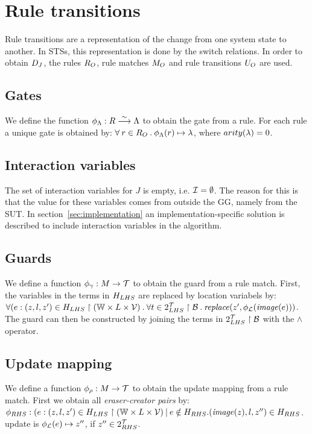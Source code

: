 \section{Rule transitions}
Rule transitions are a representation of the change from one system state to another. In STSs, this representation is done by the switch relations. In order to obtain $D_J$, the rules $R_O$, rule matches $M_O$ and rule transitions $U_O$ are used.

\subsection{Gates}
We define the function $\phi_\Lambda: R \stackrel{\sim}{\longrightarrow} \Lambda$ to obtain the gate from a rule. For each rule a unique gate is obtained by: $\forall\:r \in R_O\: . \: \phi_\Lambda(r) \mapsto \lambda$, where $arity(\lambda) = 0$.

\subsection{Interaction variables}
The set of interaction variables for $J$ is empty, i.e. $\mathcal{I} = \emptyset$. The reason for this is that the value for these variables comes from outside the GG, namely from the SUT. In section~\ref{sec:implementation} an implementation-specific solution is described to include interaction variables in the algorithm. 

\subsection{Guards}
We define a function $\phi_\gamma: M \rightarrow \mathcal{T}$ to obtain the guard from a rule match. First, the variables in the terms in $H_{LHS}$ are replaced by location variabels by: $\forall (e:(z, l, z') \in H_{LHS}\restriction (\mathbb{W} \times L \times \mathcal{V})\: .\: \forall t \in 2^{\mathcal{T}}_{LHS}\restriction\mathcal{B}\: .\: \mathit{replace}(z', \phi_{\mathcal{L}}(\mathit{image}(e)))$. The guard can then be constructed by joining the terms in $2^{\mathcal{T}}_{LHS}\restriction\mathcal{B}$ with the $\land$ operator.

\subsection{Update mapping}
We define a function $\phi_\rho: M \rightarrow \mathcal{T}$ to obtain the update mapping from a rule match. First we obtain all \textit{eraser-creator pairs} by: $\phi_{RHS}: (e:(z, l, z') \in H_{LHS}\restriction (\mathbb{W} \times L \times \mathcal{V})\: |\: e \notin H_{RHS} . (\mathit{image}(z), l, z'') \in H_{RHS}$. update is $\phi_{\mathcal{L}}(e) \mapsto z''$, if $z'' \in 2^{\mathcal{T}}_{RHS}$.

